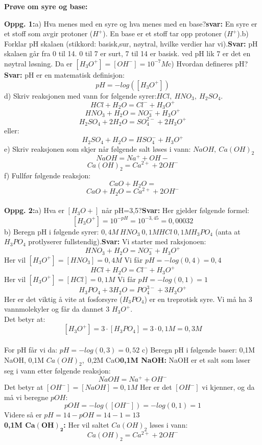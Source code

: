 \documentclass{minmal}
\begin{document}
 \begin{center}
    \textbf{Prøve om syre og base:}
\end{center}
\textbf{Oppg. 1:}\nl[1]
a) Hva menes med en syre og hva menes med en base?\nl[1]
\textbf{svar:} En syre er et stoff som avgir protoner ($H^+$). En base er et stoff tar opp protoner ($H^+$).\nl[1]
b) Forklar pH skalaen (stikkord: basisk,sur, nøytral, hvilke verdier har vi).\nl[1]
\textbf{Svar:} pH skalaen går fra 0 til 14.  0 til 7 er surt, 7 til 14 er basisk. ved pH lik 7 er det en nøytral løsning. Da er $[H_3O^+]=[OH^-]=10^{-7}M$\nl[1]
c) Hvordan defineres pH?\nl[1]
\textbf{Svar:} pH er en matematisk definisjon:\nl[1]
$$pH=-log([H_3O^+])$$\nl[1]
d) Skriv reaksjonen med vann for følgende syrer:$HCl,\ HNO_3,\ H_2SO_4$.\nl[1]
$$HCl+H_2O=Cl^-+H_3O^+$$
$$HNO_3+H_2O=NO_3^-+H_3O^+$$
$$H_2SO_4+2H_2O=SO_4^{2-}+2H_3O^+$$  eller:\\
$$H_2SO_4+H_2O=HSO_4^{-}+H_3O^+$$
e) Skriv reaksjonen som skjer når følgende salt løses i vann: $NaOH,\ Ca(OH)_2$\nl[1]
$$NaOH=Na^++OH-$$
$$Ca(OH)_2=Ca^{2+}+2OH^-$$
\newpage
f) Fullfør følgende reaksjon:\nl[1]
$$CaO + H_2O =$$\nl[1]
$$CaO+H_2O=Ca^{2+}+2OH^-$$\\
\textbf{Oppg. 2:}\nl[1]
a) Hva er $[H_3O+]$ når pH=3,5?\nl[1]
\textbf{Svar:}  Her gjelder følgende formel: \\
$$[H_3O^+]=10^{-pH}=10^{-3,45}=0,00032$$
b) Beregn pH i følgende syrer: $0,4M\ HNO_3\ 0,1M HCl\ 0,1M H_3PO_4$
(anta at $H_3PO_4$ protlyserer fullstendig).\nl[1]
\textbf{Svar:} Vi starter med raksjonoen:
$$HNO_3+H_2O=NO_3^-+H_3O^+$$
Her vil $[H_3O^+]=[HNO_3]=0,4M$ Vi får $pH=-log(0,4)=0,4$
\nl[1]
$$HCl+H_2O=Cl^-+H_3O^+$$
Her vil $[H_3O^+]=[HCl]=0,1M$ Vi får $pH=-log(0,1)=1$
\nl[1]
$$H_3PO_4+3H_2O=PO_4^{3-}+3H_3O^+$$
Her er det viktig å vite at fosforsyre ($H_3PO_4$) er en treprotisk syre. Vi må ha 3 vannmolekyler og får da dannet 3 $H_3O^+$. \\ 
Det betyr at:$$[H_3O^+]=3\cdot [H_3PO_4]=3\cdot 0,1M=0,3M$$\\
For pH får vi da: $pH=-log(0,3)=0,52$\newpage 
\noindent c) Beregn pH i følgende baser: 0,1M NaOH, 0,1M $Ca(OH)_2$,\ 0,2M CaO\nl[1]
\textbf{0,1M NaOH:}  NaOH er et salt som løser seg i vann etter følgende reaksjon:
$$NaOH=Na^++OH^-$$
Det betyr at $[OH^-]=[NaOH]=0,1M$
Her er det $[OH^-]$ vi kjenner, og da må vi beregne $pOH$:
$$pOH=-log([OH^-])=-log(0,1)=1$$
Videre  så er $pH=14-pOH=14-1=13$\\
\textbf{0,1M $\mathbf{Ca(OH)_2}$:}  Her vil saltet $Ca(OH)_2$ løses i vann:
$$Ca(OH)_2=Ca^{2+}+2OH^-$$
\end{document}
